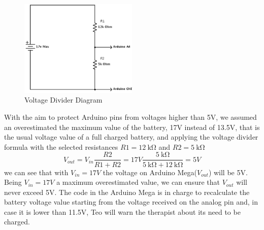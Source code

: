 \begin{figure}[h]
	\centering
	\includegraphics[width=0.5\textwidth]{voltage-divider}
	\caption{Voltage Divider Diagram}
	\label{fig:voltageDiv}
\end{figure}

With the aim to protect Arduino pins from voltages higher than 5V, we assumed an overestimated the maximum value of the battery, 17V instead of 13.5V, that is the usual voltage value of a full charged battery, and applying the voltage divider formula with the selected resistances $R1=\SI{12}{\kohm}$ and $R2=\SI{5}{\kohm}$
$$V_{out}=V_{in}\frac{R2}{R1+R2}=17V\frac{\SI{5}{\kohm}}{\SI{5}{\kohm}+\SI{12}{\kohm}}=5V$$
we can see that with $V_{in}=17V$ the voltage on Arduino Mega($V_{out}$) will be 5V. Being $V_{in}=17V$ a maximum overestimated value, we can ensure that $V_{out}$ will never exceed 5V.
The code in the Arduino Mega is in charge to recalculate the battery voltage value starting from the voltage received on the analog pin and, in case it is lower than 11.5V, Teo will warn the therapist about its need to be charged. 